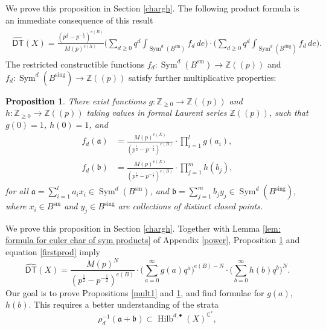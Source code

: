 \documentclass{amsart}
\newtheorem{proposition}[theorem]{Proposition}
\theoremstyle{definition}
\newcommand{\CC} {\mathbb{C}}          %
\newcommand{\ZZ} {\mathbb{Z}}		%
\newcommand{\Sym}{\operatorname{Sym}}
\newcommand{\Hilb}{\operatorname{Hilb}}
\newcommand{\DT}{\mathsf{DT}}
\newcommand{\sm}{\operatorname{sm}}
\newcommand{\sing}{\operatorname{sing}}
\newcommand{\DThat}{\widehat{\DT}}
\begin{document}
We prove this proposition in Section \ref{chargh}. The following product formula is an immediate consequence of this result
\begin{align}
\begin{split} \label{firstprod}
\DThat (X)  = \frac{(p^{\frac{1}{2}} - p^{-\frac{1}{2}})^{e(B)}}{M(p)^{e(X)}}  \Bigg( \sum_{d \geq 0} q^d \int_{\Sym^d(B^{\sm})} f_d \, de \Bigg) \cdot \Bigg( \sum_{d \geq 0} q^d \int_{\Sym^d(B^{\sing})} f_d \, de \Bigg). 
\end{split}
\end{align}
The restricted constructible functions $f_d  : \Sym^d(B^{\sm}) \rightarrow \ZZ(\!(p)\!)$ and $f_d  : \Sym^d(B^{\sing}) \rightarrow \ZZ(\!(p)\!)$ satisfy further multiplicative properties:
\begin{proposition} \label{mult2}
There exist functions $g : \ZZ_{\geq 0} \rightarrow \ZZ(\!(p)\!)$ and $h : \ZZ_{\geq 0} \rightarrow \ZZ(\!(p)\!)$ taking values in formal Laurent series $\ZZ(\!(p)\!)$, such that $g(0)=1$, $h(0)=1$, and
\begin{align*}
f_{d}(\mathfrak{a}) &= \frac{M(p)^{e(X)}}{(p^{\frac{1}{2}} - p^{-\frac{1}{2}})^{e(B)}} \cdot \prod_{i=1}^l g(a_i), \\
f_{d}(\mathfrak{b}) &= \frac{M(p)^{e(X)}}{(p^{\frac{1}{2}} - p^{-\frac{1}{2}})^{e(B)}} \cdot \prod_{j=1}^m h(b_j), 
\end{align*}
for all $\mathfrak{a} = \sum_{i=1}^l a_i x_i \in \Sym^{d}(B^{\sm})$, and $\mathfrak{b} = \sum_{j=1}^m b_j y_j \in \Sym^{d}(B^{\sing})$, where $x_i \in B^{\sm}$ and $y_j \in B^{\sing}$ are collections of distinct closed points.
\end{proposition}
We prove this proposition in Section \ref{chargh}. Together with Lemma \ref{lem: formula for euler char of sym products} of Appendix \ref{power}, Proposition \ref{mult2} and equation \eqref{firstprod} imply
\begin{equation} \label{initialprod}
\DThat (X) = \frac{M(p)^{N}}{(p^{\frac{1}{2}} - p^{-\frac{1}{2}})^{e(B)}} \cdot \Bigg( \sum_{a=0}^{\infty} g(a) q^a \Bigg)^{e(B) - N} \cdot \Bigg( \sum_{b=0}^{\infty} h(b) q^b \Bigg)^N.
\end{equation}
Our goal is to prove Propositions \ref{mult1} and \ref{mult2}, and find formulae for $g(a)$, $h(b)$. This requires a better understanding of the strata
$$
\rho_{d}^{-1} (\mathfrak{a} + \mathfrak{b}) \subset \Hilb^{d, \bullet}(X)^{\CC^*},
$$
\end{document}
